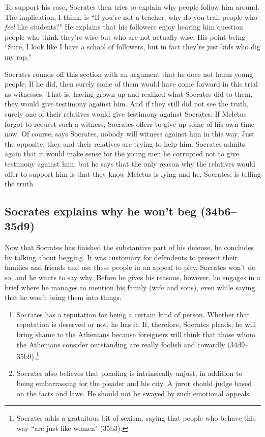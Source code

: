 \documentclass[11pt]{article}
\begin{document}
To support his case, Socrates then tries to explain why people follow him around.  The implication, I think, is ``If you're not a teacher, why do you trail people who \emph{feel} like students?"  He explains that his followers enjoy hearing him question people who think they're wise but who are not actually wise.  His point being ``Sure, I look like I have a school of followers, but in fact they're just kids who dig my rap."

Socrates rounds off this section with an argument that he does not harm young people.  If he did, then surely some of them would have come forward in this trial as witnesses.  That is, having grown up and realized what Socrates did to them, they would give testimony against him.  And if they still did not see the truth, surely one of their relatives would give testimony against Socrates.  If Meletus forgot to request such a witness, Socrates offers to give up some of his own time now.  Of course, says Socrates, nobody will witness against him in this way.  Just the opposite: they and their relatives are trying to help him.  Socrates admits again that it would make sense for the young men he corrupted not to give testimony against him, but he says that the only reason why the relatives would offer to support him is that they know Meletus is lying and he, Socrates, is telling the truth.


\subsection{Socrates explains why he won't beg (34b6--35d9)}

Now that Socrates has finished the substantive part of his defense, he concludes by talking about begging.  It was customary for defendents to present their families and friends and use these people in an appeal to pity.  Socrates won't do so, and he wants to say why.  Before he gives his reasons, however, he engages in a brief  where he manages to mention his family (wife and sons), even while saying that he won't bring them into things.

\begin{enumerate}
    \item Socrates has a reputation for being a certain kind of person.  Whether that reputation is deserved or not, he has it. If, therefore, Socrates pleads, he will bring shame to the Athenians because foreigners will think that those whom the Athenians consider outstanding are really foolish and cowardly (34d9--35b9).\footnote{Socrates adds a gratuitous bit of sexism, saying that people who behave this way ``are just like women" (35b3).}
    \item Socrates also believes that pleading is intrinsically unjust, in addition to being embarrassing for the pleader and his city.  A juror should judge based on the facts and laws.  He should not be swayed by such emotional appeals.
\end{enumerate}
\end{document}
